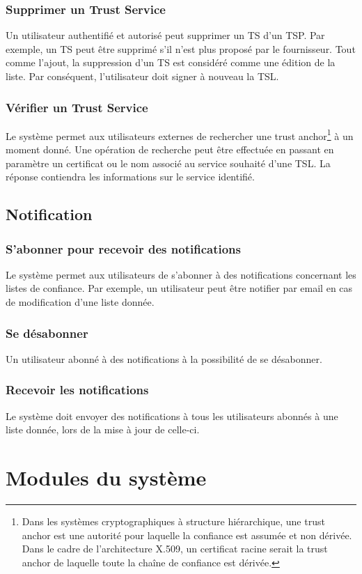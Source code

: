 \documentclass{tnreport}
\begin{document}
\subsubsection{Supprimer un Trust Service}
Un utilisateur authentifié et autorisé peut supprimer un TS d'un TSP. Par exemple, un TS peut être supprimé s'il n'est plus proposé par le fournisseur. Tout comme l'ajout, la suppression d'un TS est considéré comme une édition de la liste. Par conséquent, l'utilisateur doit signer à nouveau la TSL.
\subsubsection{Vérifier un Trust Service}
Le système permet aux utilisateurs externes de rechercher une 
trust anchor\footnote{Dans les systèmes cryptographiques à structure hiérarchique, une trust anchor est une autorité pour laquelle la confiance est assumée et non dérivée. Dans le cadre de l'architecture X.509, un certificat racine serait la trust anchor de laquelle toute la chaîne de confiance est dérivée.} 
à un moment donné. 
Une opération de recherche peut être effectuée en passant en paramètre un certificat ou le nom associé au service souhaité d'une TSL. La réponse contiendra les informations sur le service identifié.

\subsection{Notification}
\subsubsection{S'abonner pour recevoir des notifications}
Le système permet aux utilisateurs de s'abonner à des notifications concernant les listes de confiance. Par exemple, un utilisateur peut être notifier par email en cas de modification d'une liste donnée.
\subsubsection{Se désabonner}
Un utilisateur abonné à des notifications à la possibilité de se désabonner.
\subsubsection{Recevoir les notifications}
Le système doit envoyer des notifications à tous les utilisateurs abonnés à une liste donnée, lors de la mise à jour de celle-ci.

\section{Modules du système}
\label{sec:modules}
\end{document}
